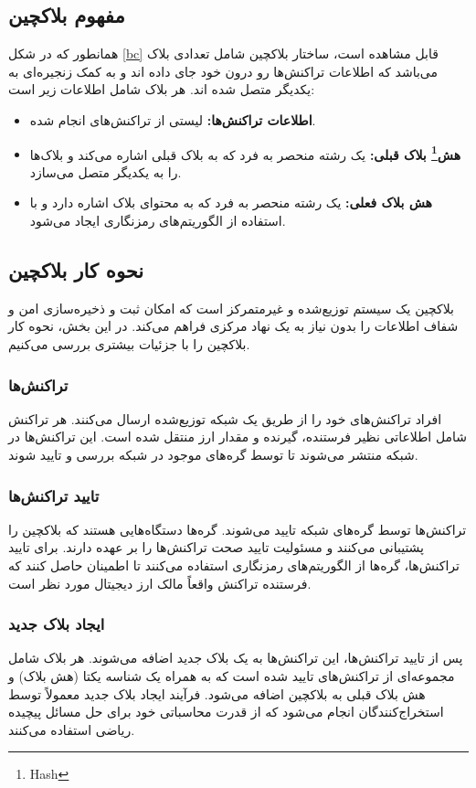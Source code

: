 \subsection{مفهوم بلاکچین}
همانطور که در شکل \ref{bc} قابل مشاهده است، ساختار بلاکچین شامل تعدادی بلاک می‌باشد که اطلاعات تراکنش‌ها رو درون خود جای داده اند و به کمک زنجیره‌ای به یکدیگر متصل شده اند. هر بلاک شامل اطلاعات زیر است:

\begin{itemize}
    \item \textbf{اطلاعات تراکنش‌ها:}  لیستی از تراکنش‌های انجام شده.
    \item \textbf{هش\footnote{ Hash } بلاک قبلی:} یک رشته منحصر به فرد که به بلاک قبلی اشاره می‌کند و بلاک‌ها را به یکدیگر متصل می‌سازد.
    \item \textbf{هش بلاک فعلی:} یک رشته منحصر به فرد که به محتوای بلاک اشاره دارد و با استفاده از الگوریتم‌های رمزنگاری ایجاد می‌شود.
\end{itemize}

\subsection{نحوه کار بلاکچین}

بلاکچین یک سیستم توزیع‌شده و غیرمتمرکز است که امکان ثبت و ذخیره‌سازی امن و شفاف اطلاعات را بدون نیاز به یک نهاد مرکزی فراهم می‌کند. در این بخش، نحوه کار بلاکچین را با جزئیات بیشتری بررسی می‌کنیم.

\subsubsection{تراکنش‌ها}
افراد تراکنش‌های خود را از طریق یک شبکه توزیع‌شده ارسال می‌کنند. هر تراکنش شامل اطلاعاتی نظیر فرستنده، گیرنده و مقدار ارز منتقل شده است. این تراکنش‌ها در شبکه منتشر می‌شوند تا توسط گره‌های موجود در شبکه بررسی و تایید شوند.

\subsubsection{تایید تراکنش‌ها}
تراکنش‌ها توسط گره‌های شبکه تایید می‌شوند. گره‌ها دستگاه‌هایی هستند که بلاکچین را پشتیبانی می‌کنند و مسئولیت تایید صحت تراکنش‌ها را بر عهده دارند. برای تایید تراکنش‌ها، گره‌ها از الگوریتم‌های رمزنگاری استفاده می‌کنند تا اطمینان حاصل کنند که فرستنده تراکنش واقعاً مالک ارز دیجیتال مورد نظر است.

\subsubsection{ایجاد بلاک جدید}
پس از تایید تراکنش‌ها، این تراکنش‌ها به یک بلاک جدید اضافه می‌شوند. هر بلاک شامل مجموعه‌ای از تراکنش‌های تایید شده است که به همراه یک شناسه یکتا (هش بلاک) و هش بلاک قبلی به بلاکچین اضافه می‌شود. فرآیند ایجاد بلاک جدید معمولاً توسط استخراج‌کنندگان  انجام می‌شود که از قدرت محاسباتی خود برای حل مسائل پیچیده ریاضی استفاده می‌کنند.


